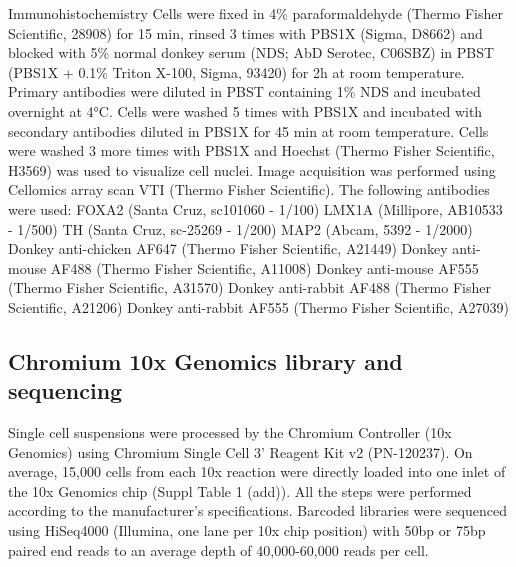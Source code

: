 Immunohistochemistry 
Cells were fixed in 4\% paraformaldehyde (Thermo Fisher Scientific, 28908) for 15 min, rinsed 3 times with PBS1X (Sigma, D8662) and blocked with 5\% normal donkey serum (NDS; AbD Serotec, C06SBZ) in PBST (PBS1X + 0.1\% Triton X-100, Sigma, 93420) for 2h at room temperature. Primary antibodies were diluted in PBST containing 1\% NDS and incubated overnight at 4°C.
Cells were washed 5 times with PBS1X and incubated with secondary antibodies diluted in PBS1X for 45 min at room temperature.  
Cells were washed 3 more times with PBS1X and Hoechst (Thermo Fisher Scientific, H3569) was used to visualize cell nuclei. Image acquisition was performed using Cellomics array scan VTI (Thermo Fisher Scientific).
The following antibodies were used: 
FOXA2 (Santa Cruz, sc101060 - 1/100)
LMX1A (Millipore, AB10533 - 1/500)
TH (Santa Cruz, sc-25269 - 1/200)
MAP2 (Abcam, 5392 - 1/2000)
Donkey anti-chicken AF647 (Thermo Fisher Scientific, A21449)
Donkey anti-mouse AF488 (Thermo Fisher Scientific, A11008)
Donkey anti-mouse AF555 (Thermo Fisher Scientific, A31570)
Donkey anti-rabbit AF488 (Thermo Fisher Scientific, A21206)
Donkey anti-rabbit AF555 (Thermo Fisher Scientific, A27039)

\subsection{Chromium 10x Genomics library and sequencing}
Single cell suspensions were processed by the Chromium Controller (10x Genomics) using Chromium Single Cell 3’ Reagent Kit v2 (PN-120237). 
On average, 15,000 cells from each 10x reaction were directly loaded into one inlet of the 10x Genomics chip (Suppl Table 1 (add)). 
All the steps were performed according to the manufacturer's specifications. 
Barcoded libraries were sequenced using HiSeq4000 (Illumina, one lane per 10x chip position) with 50bp or 75bp paired end reads to an average depth of 40,000-60,000 reads per cell.